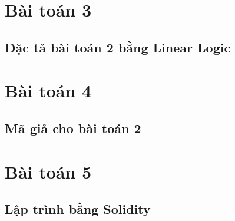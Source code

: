 \documentclass[a4paper]{article}
\begin{document}
\section{Bài toán 3}
\subsection{Đặc tả bài toán 2 bằng Linear Logic}


\section{Bài toán 4}
\subsection{Mã giả cho bài toán 2}


\section{Bài toán 5}
\subsection{Lập trình bằng Solidity}


\begin{thebibliography}{80}





\end{thebibliography}
\end{document}
